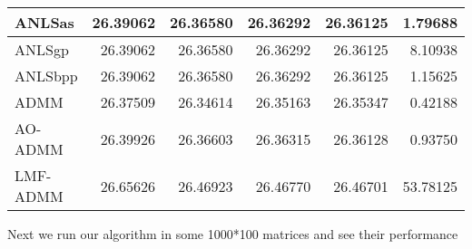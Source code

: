 \documentclass{article}
\begin{document}
\begin{table}[H]
\begin{tabular}{|l|r|r|r|r|r|}
 		ANLSas   & 26.39062                & 26.36580                & 26.36292                 & 26.36125                 & 1.79688                      \\ \hline
 		ANLSgp   & 26.39062                & 26.36580                & 26.36292                 & 26.36125                 & 8.10938                      \\ \hline
 		ANLSbpp  & 26.39062                & 26.36580                & 26.36292                 & 26.36125                 & 1.15625                      \\ \hline
 		ADMM     & 26.37509                & 26.34614                & 26.35163                 & 26.35347                 & 0.42188                      \\ \hline
 		AO-ADMM  & 26.39926                & 26.36603                & 26.36315                 & 26.36128                 & 0.93750                      \\ \hline
 		LMF-ADMM & 26.65626                & 26.46923                & 26.46770                 & 26.46701                 & 53.78125                     \\ \hline
 	\end{tabular}
 \end{table}
Next we run our algorithm in some 1000*100 matrices and see their performance
\end{document}

